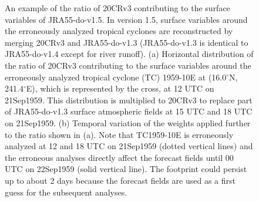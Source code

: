 \documentclass[dvipdfmx]{elsarticle_mod}
\begin{document}
\begin{figure}[h]
\centering
 \caption{An example of the ratio of 20CRv3 contributing to the surface variables of JRA55-do-v1.5. In version 1.5, surface variables around the erroneously analyzed tropical cyclones are reconstructed by merging 20CRv3 and JRA55-do-v1.3 (JRA55-do-v1.3 is identical to JRA55-do-v1.4 except for river runoff). (a) Horizontal distribution of the ratio of 20CRv3 contributing to the surface variables around the erroneously analyzed tropical cyclone (TC) 1959-10E at (16.0$^{\circ}$N, 241.4$^{\circ}$E), which is represented by the cross, at 12 UTC on 21Sep1959. This distribution is multiplied to 20CRv3 to replace part of JRA55-do-v1.3 surface atmospheric fields at 15 UTC and 18 UTC on 21Sep1959. (b) Temporal variation of the weights applied further to the ratio shown in (a). Note that TC1959-10E is erroneously analyzed at 12 and 18 UTC on 21Sep1959 (dotted vertical lines) and the erroneous analyses directly affect the forecast fields until 00 UTC on 22Sep1959 (solid vertical line). The footprint could persist up to about 2 days because the forecast fields are used as a first guess for the subsequent analyses.}
  \label{fig:weight_for_20CRv3}
\end{figure}
\end{document}

